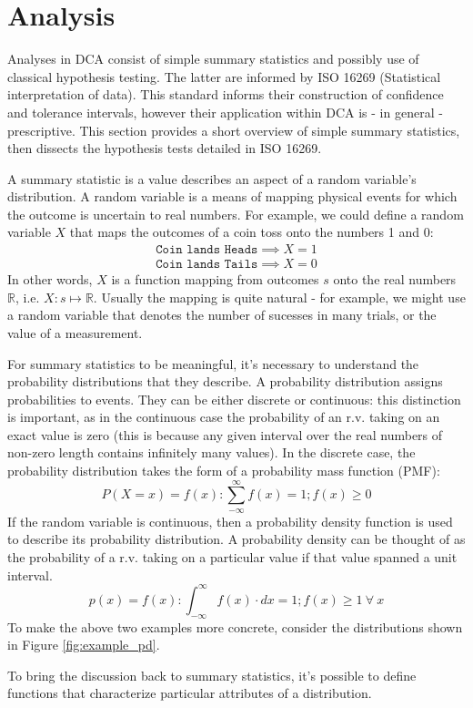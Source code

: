 \documentclass[11pt,a4paper,article]{memoir} %
\begin{document}
\section{Analysis}
Analyses in DCA consist of simple summary statistics and possibly use of classical hypothesis testing. The latter are informed by ISO 16269 (Statistical interpretation of data). This standard informs their construction of confidence and tolerance intervals, however their application within DCA is - in general - prescriptive. This section provides a short overview of simple summary statistics, then dissects the hypothesis tests detailed in ISO 16269.
\par
 A summary statistic is a value describes an aspect of a random variable's distribution. A random variable is a means of mapping physical events for which the outcome is uncertain to real numbers. For example, we could define a random variable $X$ that maps the outcomes of a coin toss onto the numbers 1 and 0:
 \begin{align}
	\texttt{Coin lands Heads} \implies X = 1 \\
	\texttt{Coin lands Tails} \implies X = 0
 \end{align}
In other words, $X$ is a function mapping from outcomes $s$ onto the real numbers $\mathbb{R}$, i.e. $X: s \mapsto \mathbb{R}$. Usually the mapping is quite natural - for example, we might use a random variable that denotes the number of sucesses in many trials, or the value of a measurement.
\par
For summary statistics to be meaningful, it's necessary to understand the probability distributions that they describe. A probability distribution assigns probabilities to events. They can be either discrete or continuous: this distinction is important, as in the continuous case the probability of an r.v. taking on an exact value is zero (this is because any given interval over the real numbers of non-zero length contains infinitely many values). In the discrete case, the probability distribution takes the form of a probability mass function (PMF):
\[
	P(X = x) = f(x) : \sum_{-\infty}^{\infty} f(x) = 1; f(x) \geq 0
\]
If the random variable is continuous, then a probability density function is used to describe its probability distribution. A probability density can be thought of as the probability of a r.v. taking on a particular value if that value spanned a unit interval.
\[
	p(x) = f(x) : \int_{-\infty}^{\infty}f(x)\cdot dx = 1; f(x) \geq 1 \ \forall \ x
\]
To make the above two examples more concrete, consider the distributions shown in Figure \ref{fig:example_pd}.
\begin{figure}

\end{figure}
 \par
 To bring the discussion back to summary statistics, it's possible to define functions that characterize particular attributes of a distribution.
 
\end{document}
